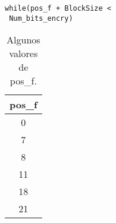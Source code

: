 \documentclass[10pt]{IEEEtran}
\begin{document}
\begin{enumerate}
\begin{itemize}
\begin{verbatim}
while(pos_f + BlockSize <
 Num_bits_encry)
\end{verbatim}

\begin{table}[H]
\centering
\caption{Algunos valores de pos\_f.}
\begin{tabular}[c]{|c|}
\hline
\hline
pos\_f  \\
\hline
\hline
0   \\
\hline
7   \\
\hline
8   \\
\hline
11   \\
\hline
18  \\
\hline
21 \\
\hline
\hline
\end{tabular}
\end{table}




\end{itemize}

\end{enumerate}
\end{document}

